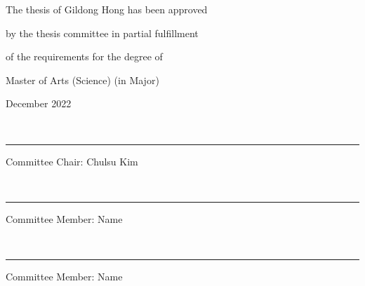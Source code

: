 \documentclass{report}
\begin{document}
\newpage 
\begin{center}
\Large
The thesis of Gildong Hong has been approved \par %
by the thesis committee in partial fulfillment\par
of the requirements for the degree of \par
Master of Arts (Science) (in Major) 
\par\vspace{50pt}
\large December 2022 %
\par\vspace{50pt}
{\small\color{gray}{signiture}}\\[-10pt]\rule{.6\textwidth}{0.4pt}\par
Committee Chair: Chulsu Kim %
\par\vspace{20pt}
{\small\color{gray}{signiture}}\\[-10pt]\rule{.6\textwidth}{0.4pt}\par
Committee Member: Name %
\par\vspace{20pt}
{\small\color{gray}{signiture}}\\[-10pt]\rule{.6\textwidth}{0.4pt}\par
Committee Member: Name %
\end{center}
\end{document}

